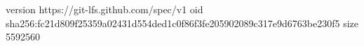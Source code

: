 version https://git-lfs.github.com/spec/v1
oid sha256:fc21d809f25359a02431d554ded1c0f86f3fe205902089c317e9d6763be230f5
size 5592560
